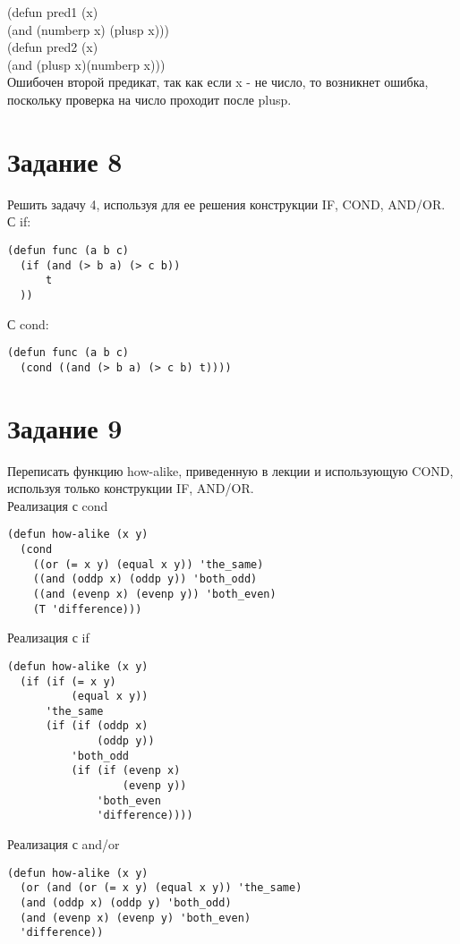(defun pred1 (x) \\
(and (numberp x) (plusp x)))\\

(defun pred2 (x) \\
(and (plusp x)(numberp x)))\\

Ошибочен второй предикат, так как если x - не число, то возникнет ошибка, поскольку проверка на число проходит после plusp.

\section{Задание 8}
Решить задачу 4, используя для ее решения конструкции
IF, COND, AND/OR.\\

С if:
\begin{lstlisting}
(defun func (a b c)
  (if (and (> b a) (> c b))
      t
  ))
\end{lstlisting}

С cond:
\begin{lstlisting}
(defun func (a b c)
  (cond ((and (> b a) (> c b) t))))
\end{lstlisting}

\section{Задание 9}Переписать функцию how-alike, приведенную в лекции и использующую COND, используя
только конструкции IF, AND/OR.\\

Реализация с cond
\begin{lstlisting}
(defun how-alike (x y)
  (cond
    ((or (= x y) (equal x y)) 'the_same)
    ((and (oddp x) (oddp y)) 'both_odd)
    ((and (evenp x) (evenp y)) 'both_even)
    (T 'difference)))
\end{lstlisting}

Реализация с if
\begin{lstlisting}
(defun how-alike (x y)
  (if (if (= x y)
          (equal x y))
      'the_same
      (if (if (oddp x)
              (oddp y))
          'both_odd
          (if (if (evenp x)
                  (evenp y))
              'both_even
              'difference))))
\end{lstlisting}

Реализация с and/or
\begin{lstlisting}
(defun how-alike (x y)
  (or (and (or (= x y) (equal x y)) 'the_same)
  (and (oddp x) (oddp y) 'both_odd)
  (and (evenp x) (evenp y) 'both_even)
  'difference))
\end{lstlisting}